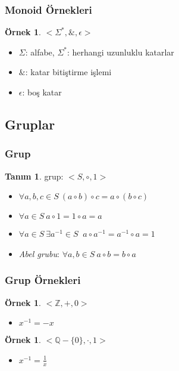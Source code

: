 \documentclass[dvipsnames]{beamer}
\theoremstyle{definition}
\newtheorem{tanim}[theorem]{Tanım}
\theoremstyle{example}
\newtheorem{ornek}[theorem]{Örnek}
\theoremstyle{plain}
\begin{document}
\begin{frame}
  \frametitle{Monoid Örnekleri}

  \begin{ornek}
    $<\Sigma^*,\&,\epsilon>$

    \begin{itemize}
      \item $\Sigma$: alfabe, $\Sigma^*$: herhangi uzunluklu katarlar
      \item $\&$: katar bitiştirme işlemi
      \item $\epsilon$: boş katar
    \end{itemize}
  \end{ornek}
\end{frame}

\subsection{Gruplar}

\begin{frame}
  \frametitle{Grup}

  \begin{tanim}
    \alert{grup}: $<S,\circ,1>$

    \begin{itemize}
      \item $\forall a,b,c \in S~(a \circ b) \circ c = a \circ (b \circ c)$
      \item $\forall a \in S~a \circ 1 = 1 \circ a = a$
      \item $\forall a \in S~\exists a^{-1} \in S~$
        $a \circ a^{-1} = a^{-1} \circ a = 1$

      \pause
      \medskip
      \item \emph{Abel grubu}: $\forall a,b \in S~a \circ b = b \circ a$
    \end{itemize}
  \end{tanim}
\end{frame}

\begin{frame}
  \frametitle{Grup Örnekleri}

  \begin{ornek}
    $<\mathbb{Z},+,0>$

    \begin{itemize}
      \item $x^{-1} = -x$
    \end{itemize}
  \end{ornek}

  \pause
  \begin{ornek}
    $<\mathbb{Q}-\{0\},\cdot,1>$

    \begin{itemize}
      \item $x^{-1} = \frac{1}{x}$
    \end{itemize}
  \end{ornek}
\end{frame}
\end{document}
